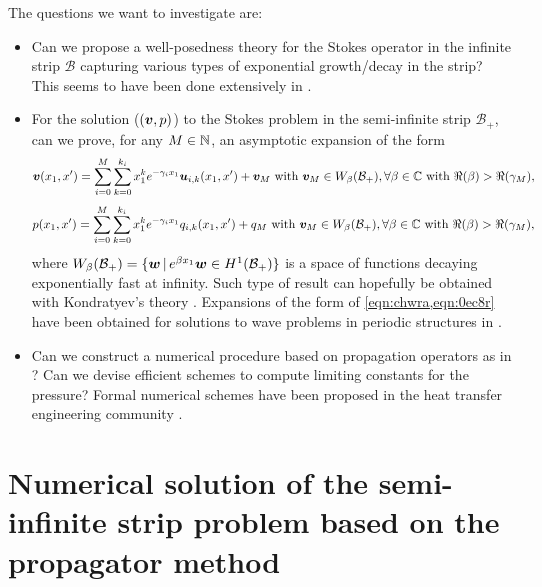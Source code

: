 \documentclass[a4paper,10pt,reqno]{amsart}
\begin{document}
The questions we want to investigate are:   
\begin{itemize}
    \item Can we propose a well-posedness theory for the Stokes operator in the
        infinite strip $\mathcal{B}$ capturing various types of exponential
        growth/decay in the strip? This seems to have been done extensively in
        \cite{nazarov_navier-stokes_2000-1}.    
    \item For the solution ($({\bm v},p)$) to the Stokes problem in the semi-infinite strip
        $\mathcal{B}_+$, can we prove, for any $M\in\mathbb{N}$, an asymptotic expansion of
        the form    
        \begin{equation}
        \label{eqn:chwra}
        {\bm v}(x_1,x')=\sum_{i=0}^{M}\sum_{k=0}^{k_i} x_1^{k}e^{-\gamma_i
        x_1}{\bm u}_{i,k}(x_1,x')+{\bm v}_M \text{ with }{\bm v}_M \in
        W_\beta(\mathcal{B}_+),\forall \beta\in \mathbb{C} \text{ with
        }\Re(\beta)>\Re(\gamma_M),
        \end{equation}
        \begin{equation}
        \label{eqn:0ec8r}
        p(x_1,x')=\sum_{i=0}^{M}\sum_{k=0}^{k_i} x_1^{k}e^{-\gamma_i
        x_1}q_{i,k}(x_1,x')+q_M \text{ with }{\bm v}_M \in
        W_\beta(\mathcal{B}_+),\forall \beta\in \mathbb{C} \text{ with
        }\Re(\beta)>\Re(\gamma_M),
        \end{equation}
        where $W_{\beta}(\mathcal{B}_+)=\{ {\bm w}\,|\,e^{\beta x_1}{\bm w} \in
        H^{1}(\mathcal{B}_+)\}$ is a space of functions decaying exponentially fast
        at infinity.
        Such type of result can hopefully be obtained with Kondratyev's theory
        \cite{kozlov_elliptic_1997,nazarov_elliptic_2011}. Expansions of the form of
        \cref{eqn:chwra,eqn:0ec8r} have been obtained for solutions to wave problems
        in periodic structures in
        \cite{hohage_riesz_2013,bourgeois_well-posedness_2018}.
    \item Can we construct a numerical procedure based on propagation operators     
        as in
        \cite{fliss_dirichlet--neumann_2013,fliss_dirichlet--neumann_2021}? Can we
        devise efficient schemes to compute limiting constants for the pressure?    
        Formal numerical schemes have been proposed in the heat transfer engineering
        community \cite{buckinx_macro-scale_2022,vangeffelen_developed_2023}.
\end{itemize}
\section{Numerical solution of the semi-infinite strip problem based on the
propagator method}
    



\end{document}

